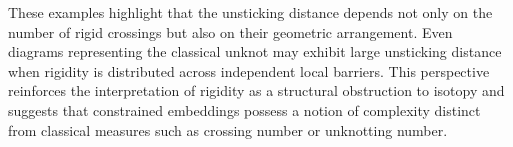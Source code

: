 \documentclass[11pt,a4paper]{article}
\theoremstyle{plain}
\theoremstyle{definition}
\begin{document}
These examples highlight that the unsticking distance depends not only on the number of rigid crossings but also on their geometric arrangement. Even diagrams representing the classical unknot may exhibit large unsticking distance when rigidity is distributed across independent local barriers. This perspective reinforces the interpretation of rigidity as a structural obstruction to isotopy and suggests that constrained embeddings possess a notion of complexity distinct from classical measures such as crossing number or unknotting number.







\end{document}

